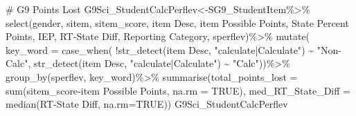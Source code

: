 \documentclass[
  letterpaper,
  DIV=11,
  numbers=noendperiod]{scrartcl}
\newenvironment{Shaded}{\begin{snugshade}}{\end{snugshade}}
\newcommand{\AttributeTok}[1]{\textcolor[rgb]{0.40,0.45,0.13}{#1}}
\newcommand{\CommentTok}[1]{\textcolor[rgb]{0.37,0.37,0.37}{#1}}
\newcommand{\ConstantTok}[1]{\textcolor[rgb]{0.56,0.35,0.01}{#1}}
\newcommand{\FunctionTok}[1]{\textcolor[rgb]{0.28,0.35,0.67}{#1}}
\newcommand{\NormalTok}[1]{\textcolor[rgb]{0.00,0.23,0.31}{#1}}
\newcommand{\OtherTok}[1]{\textcolor[rgb]{0.00,0.23,0.31}{#1}}
\newcommand{\SpecialCharTok}[1]{\textcolor[rgb]{0.37,0.37,0.37}{#1}}
\newcommand{\StringTok}[1]{\textcolor[rgb]{0.13,0.47,0.30}{#1}}
\begin{document}
\begin{Shaded}
\begin{Highlighting}[]
\CommentTok{\# G9 Points Lost}
\NormalTok{G9Sci\_StudentCalcPerflev}\OtherTok{\textless{}{-}}\NormalTok{SG9\_StudentItem}\SpecialCharTok{\%\textgreater{}\%}
  \FunctionTok{select}\NormalTok{(gender, sitem, sitem\_score, }\StringTok{\textasciigrave{}}\AttributeTok{item Desc}\StringTok{\textasciigrave{}}\NormalTok{, }\StringTok{\textasciigrave{}}\AttributeTok{item Possible Points}\StringTok{\textasciigrave{}}\NormalTok{, }\StringTok{\textasciigrave{}}\AttributeTok{State Percent Points}\StringTok{\textasciigrave{}}\NormalTok{, IEP, }\StringTok{\textasciigrave{}}\AttributeTok{RT{-}State Diff}\StringTok{\textasciigrave{}}\NormalTok{, }\StringTok{\textasciigrave{}}\AttributeTok{Reporting Category}\StringTok{\textasciigrave{}}\NormalTok{, }\StringTok{\textasciigrave{}}\AttributeTok{sperflev}\StringTok{\textasciigrave{}}\NormalTok{)}\SpecialCharTok{\%\textgreater{}\%}
  \FunctionTok{mutate}\NormalTok{( }\AttributeTok{key\_word =} \FunctionTok{case\_when}\NormalTok{(}
     \SpecialCharTok{!}\FunctionTok{str\_detect}\NormalTok{(}\StringTok{\textasciigrave{}}\AttributeTok{item Desc}\StringTok{\textasciigrave{}}\NormalTok{, }\StringTok{"calculate|Calculate"}\NormalTok{) }\SpecialCharTok{\textasciitilde{}} \StringTok{"Non{-}Calc"}\NormalTok{,}
     \FunctionTok{str\_detect}\NormalTok{(}\StringTok{\textasciigrave{}}\AttributeTok{item Desc}\StringTok{\textasciigrave{}}\NormalTok{, }\StringTok{"calculate|Calculate"}\NormalTok{) }\SpecialCharTok{\textasciitilde{}} \StringTok{"Calc"}\NormalTok{))}\SpecialCharTok{\%\textgreater{}\%}
  \FunctionTok{group\_by}\NormalTok{(}\StringTok{\textasciigrave{}}\AttributeTok{sperflev}\StringTok{\textasciigrave{}}\NormalTok{, }\StringTok{\textasciigrave{}}\AttributeTok{key\_word}\StringTok{\textasciigrave{}}\NormalTok{)}\SpecialCharTok{\%\textgreater{}\%}
  \FunctionTok{summarise}\NormalTok{(}\AttributeTok{total\_points\_lost =} \FunctionTok{sum}\NormalTok{(}\StringTok{\textasciigrave{}}\AttributeTok{sitem\_score}\StringTok{\textasciigrave{}}\SpecialCharTok{{-}}\StringTok{\textasciigrave{}}\AttributeTok{item Possible Points}\StringTok{\textasciigrave{}}\NormalTok{, }\AttributeTok{na.rm =} \ConstantTok{TRUE}\NormalTok{),}
            \AttributeTok{med\_RT\_State\_Diff =} \FunctionTok{median}\NormalTok{(}\StringTok{\textasciigrave{}}\AttributeTok{RT{-}State Diff}\StringTok{\textasciigrave{}}\NormalTok{, }\AttributeTok{na.rm=}\ConstantTok{TRUE}\NormalTok{))}
\NormalTok{G9Sci\_StudentCalcPerflev}
\end{Highlighting}
\end{Shaded}
\end{document}
